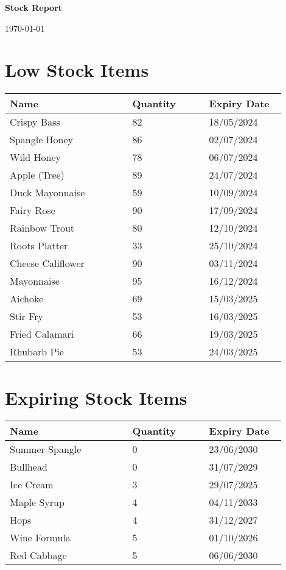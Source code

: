 \documentclass{article}
\begin{document}
\noindent
\begin{minipage}[t]{0.48\textwidth}
	\raggedright
	\LARGE \textbf{Stock Report}
\end{minipage}
\begin{minipage}[t]{0.48\textwidth}
	\raggedleft
	\large \today
\end{minipage}
\vspace{1.5em}
\section*{Low Stock Items}
\begin{longtable}{|p{0.4\linewidth}|p{0.25\linewidth}|p{0.25\linewidth}|}\hline
\textbf{Name} & \textbf{Quantity} & \textbf{Expiry Date}\\
\hline
Crispy Bass & 82 & 18/05/2024 \\
\hline
Spangle Honey & 86 & 02/07/2024 \\
\hline
Wild Honey & 78 & 06/07/2024 \\
\hline
Apple (Tree) & 89 & 24/07/2024 \\
\hline
Duck Mayonnaise & 59 & 10/09/2024 \\
\hline
Fairy Rose & 90 & 17/09/2024 \\
\hline
Rainbow Trout & 80 & 12/10/2024 \\
\hline
Roots Platter & 33 & 25/10/2024 \\
\hline
Cheese Califlower & 90 & 03/11/2024 \\
\hline
Mayonnaise & 95 & 16/12/2024 \\
\hline
Aichoke & 69 & 15/03/2025 \\
\hline
Stir Fry & 53 & 16/03/2025 \\
\hline
Fried Calamari & 66 & 19/03/2025 \\
\hline
Rhubarb Pie & 53 & 24/03/2025 \\
\hline
\end{longtable}

\section*{Expiring Stock Items}
\begin{longtable}{|p{0.4\linewidth}|p{0.25\linewidth}|p{0.25\linewidth}|}\hline
\textbf{Name} & \textbf{Quantity} & \textbf{Expiry Date}\\
\hline
Summer Spangle & 0 & 23/06/2030 \\
\hline
Bullhead & 0 & 31/07/2029 \\
\hline
Ice Cream & 3 & 29/07/2025 \\
\hline
Maple Syrup & 4 & 04/11/2033 \\
\hline
Hops & 4 & 31/12/2027 \\
\hline
Wine Formula & 5 & 01/10/2026 \\
\hline
Red Cabbage & 5 & 06/06/2030 \\
\hline
\end{longtable}
\end{document}
